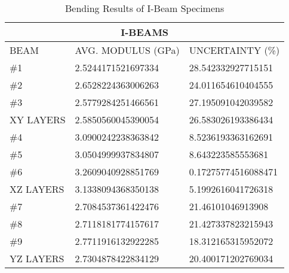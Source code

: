 \begin{longtable}{ | X | X | X | }
	\caption{Bending Results of I-Beam Specimens}
	\label{tab:ibeam_data}
	\endhead
	\hline
	\multicolumn{3}{|c|}{I-BEAMS} \\ \hline
	BEAM & AVG. MODULUS (GPa) & UNCERTAINTY (\%) \\ \hline
	\#1 & 2.5244171521697334 & 28.542332927715151 \\ \hline
	\#2 & 2.6528224363006263 & 24.011654610404555 \\ \hline
	\#3 & 2.5779284251466561 & 27.195091042039582 \\ \hline
	XY LAYERS & 2.5850560045390054 & 26.583026193386434 \\ \hline
	\#4 & 3.0900242238363842 & 8.5236193363162691 \\ \hline
	\#5 & 3.0504999937834807 & 8.643223585553681 \\ \hline
	\#6 & 3.2609040928851769 & 0.17275774516088471 \\ \hline
	XZ LAYERS & 3.1338094368350138 & 5.1992616041726318 \\ \hline
	\#7 & 2.7084537361422476 & 21.46101046913908 \\ \hline
	\#8 & 2.7118181774157617 & 21.427337823215943 \\ \hline
	\#9 & 2.7711916132922285 & 18.312165315952072 \\ \hline
	YZ LAYERS & 2.7304878422834129 & 20.400171202769034 \\ \hline
\end{longtable}
